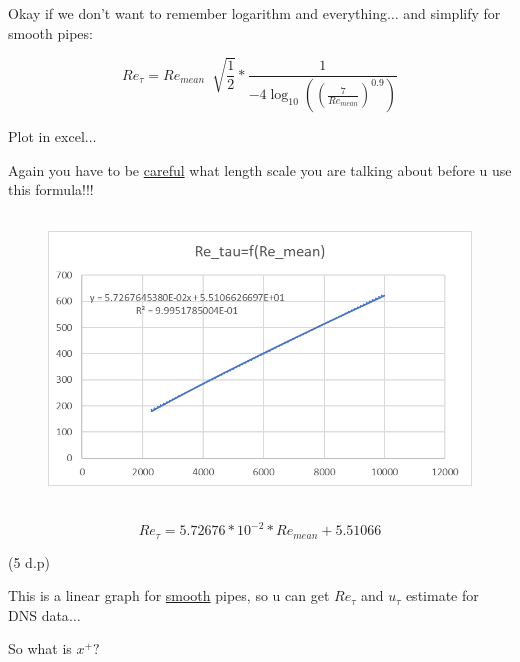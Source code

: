 \documentclass[12pt]{article}
\renewcommand{\_}{\kern-1.5pt\textunderscore\kern-1.5pt}
\begin{document}
Okay if we don’t want to remember logarithm and everything$ \ldots $  and simplify for smooth pipes:\par

 \[ Re_{ \tau}=Re_{mean}~\sqrt[]{\frac{1}{2}}\ast\frac{1}{-4\log _{10} \left(  \left( \frac{7}{Re_{mean}} \right) ^{0.9} \right) } \] \par

Plot in excel$ \ldots $ \par

Again you have to be \uline{careful} what length scale you are talking about before u use this formula!!!\par




\begin{figure}[H]
	\begin{Center}
		\includegraphics[width=5.01in,height=3.01in]{./media/image5.png}
	\end{Center}
\end{figure}



\par

 \[ Re_{ \tau}=5.72676\ast10^{-2}\ast{Re}_{mean}+5.51066 \] \par

(5 d.p)\par

This is a linear graph for \uline{smooth} pipes, so u can get  \( Re_{ \tau} \)  and  \( u_{ \tau} \)  estimate for DNS data$ \ldots $ \par

So what is  \( x^{+}? \) \par
\end{document}
